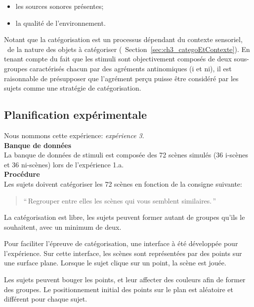 \begin{itemize}
\item les sources sonores présentes;
\item la qualité de l'environnement.
\end{itemize}

Notant que la catégorisation est un processus dépendant du contexte sensoriel, \ie~de la nature des objets à catégoriser (\cf~Section~\ref{sec:ch3_categoEtContexte}). En tenant compte du fait que les stimuli sont objectivement composés de deux sous-groupes caractérisés chacun par des agréments antinomiques (i et ni), il est raisonnable de présupposer que l'agrément perçu puisse être considéré par les sujets comme une stratégie de catégorisation.


\subsection{Planification expérimentale}

Nous nommons cette expérience: \emph{expérience 3}. \\

\textbf{Banque de données} \\ 

La banque de données de stimuli est composée des 72 scènes simulés (36 i-scènes et 36 ni-scènes) lors de l'expérience 1.a. \\ 

\textbf{Procédure} \\

Les sujets doivent catégoriser les 72 scènes en fonction de la consigne suivante:

\begin{quote}
``\,Regrouper entre elles les scènes qui vous semblent similaires.\,''
\end{quote}

La catégorisation est libre, les sujets peuvent former autant de groupes qu'ils le souhaitent, avec un minimum de deux. 

Pour faciliter l'épreuve de catégorisation, une interface à été développée pour l'expérience. Sur cette interface, les scènes sont représentées par des points sur une surface plane. Lorsque le sujet clique sur un point, la scène est jouée.

Les sujets peuvent bouger les points, et leur affecter des couleurs afin de former des groupes. Le positionnement initial des points sur le plan est aléatoire et différent pour chaque sujet.

